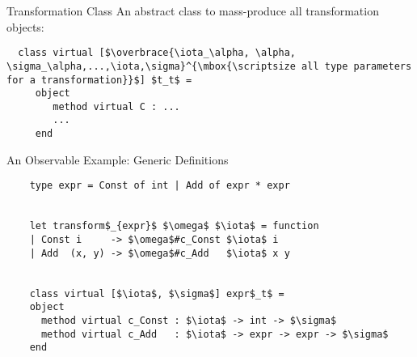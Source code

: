 \documentclass{beamer}
\theoremstyle{definition}
\theoremstyle{plain} %
\begin{document}

\begin{comment}
  Transformation objects potentially can be constructed in any way one would prefer; however, we provide a common
  base abstract class for all transformation objects (or classes). As it implements the transformation of the shape we
  dealt with on the slide 3, the transformation class is highly polymorphic~--- it has $3*n+2$ type parameters (where
  $n$ is the arity of the type (plus one extra parameter for polymorphic variants). The signatures of methods are
  expressed in terms of the class' type parameters and types of arguments for corresponding constructor. 
\end{comment}

\begin{frame}[fragile]{Transformation Class}
An abstract class to mass-produce all transformation objects:
\vskip1cm

\begin{lstlisting}
  class virtual [$\overbrace{\iota_\alpha, \alpha, \sigma_\alpha,...,\iota,\sigma}^{\mbox{\scriptsize all type parameters for a transformation}}$] $t_t$ =
     object
        method virtual C : ...
        ...
     end     
\end{lstlisting}

\end{frame}


\begin{comment}
  We consider a small observable example right away. For the shown simple type with two constructors the framework
  automatically generates the following transformation function and the following transformation class. As the type
  is non-polymorphic, the signature of the class is rather simple: it parameterized only by the types of
  inherited and synthezised attributes. The signatures of two methods are rather obvious. 
\end{comment}

\begin{frame}[fragile]{An Observable Example: Generic Definitions}
  \begin{lstlisting}
    type expr = Const of int | Add of expr * expr

    
    let transform$_{expr}$ $\omega$ $\iota$ = function
    | Const i     -> $\omega$#c_Const $\iota$ i
    | Add  (x, y) -> $\omega$#c_Add   $\iota$ x y

    
    class virtual [$\iota$, $\sigma$] expr$_t$ =
    object
      method virtual c_Const : $\iota$ -> int -> $\sigma$
      method virtual c_Add   : $\iota$ -> expr -> expr -> $\sigma$
    end    
  \end{lstlisting}
\end{frame}
\end{document}
